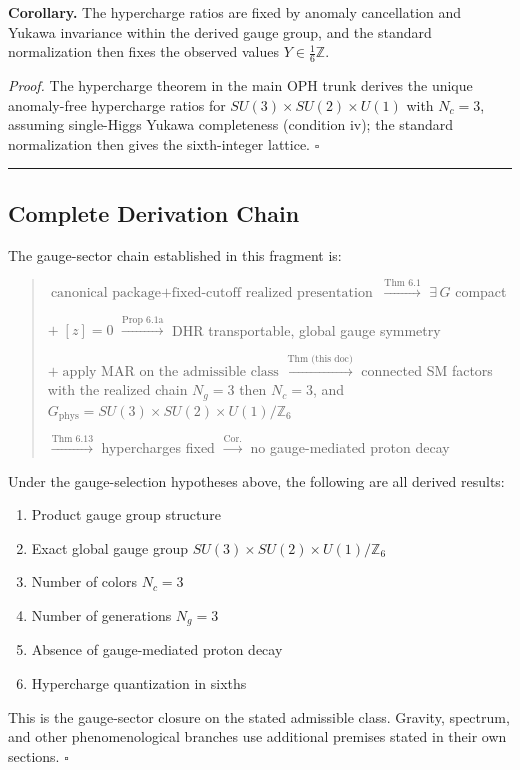 \textbf{Corollary.} The hypercharge ratios are fixed by anomaly cancellation and Yukawa invariance within the derived gauge group, and the standard normalization then fixes the observed values \(Y \in \frac{1}{6}\mathbb{Z}\).

\emph{Proof.} The hypercharge theorem in the main OPH trunk derives the unique anomaly-free hypercharge ratios for \(SU(3) \times SU(2) \times U(1)\) with \(N_c = 3\), assuming single-Higgs Yukawa completeness (condition iv); the standard normalization then gives the sixth-integer lattice. \(\square\)

\begin{center}\rule{0.5\linewidth}{0.5pt}\end{center}

\subsection{Complete Derivation Chain}\label{9-complete-derivation-chain}

The gauge-sector chain established in this fragment is:

\begin{quote}
\(\text{canonical package} + \text{fixed-cutoff realized presentation}\) \(\xrightarrow{\text{Thm 6.1}}\) \(\exists\, G\) compact

\(+ \; [z]=0\) \(\xrightarrow{\text{Prop 6.1a}}\) DHR transportable, global gauge symmetry

\(+ \;\text{apply MAR on the admissible class}\) \(\xrightarrow{\text{Thm (this doc)}}\) connected SM factors with the realized chain \(N_g = 3\) then \(N_c = 3\), and \(G_{\mathrm{phys}} = SU(3) \times SU(2) \times U(1)/\mathbb{Z}_6\)

\(\xrightarrow{\text{Thm 6.13}}\) hypercharges fixed \(\xrightarrow{\text{Cor.}}\) no gauge-mediated proton decay
\end{quote}

Under the gauge-selection hypotheses above, the following are all derived results:

\begin{enumerate}
\def\labelenumi{\arabic{enumi}.}
\tightlist
\item
  Product gauge group structure
\item
  Exact global gauge group \(SU(3) \times SU(2) \times U(1)/\mathbb{Z}_6\)
\item
  Number of colors \(N_c = 3\)
\item
  Number of generations \(N_g = 3\)
\item
  Absence of gauge-mediated proton decay
\item
  Hypercharge quantization in sixths
\end{enumerate}

This is the gauge-sector closure on the stated admissible class. Gravity, spectrum, and other phenomenological branches use additional premises stated in their own sections. \(\square\)
